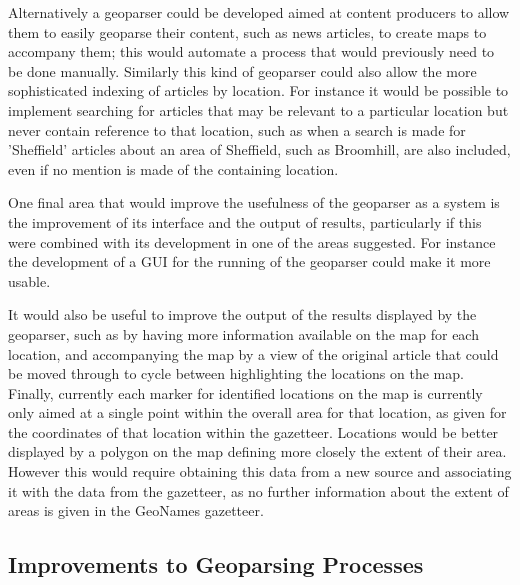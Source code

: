\documentclass[12pt, a4paper]{report}
\begin{document}
Alternatively a geoparser could be developed aimed at content producers to allow them to easily geoparse their content, such as news articles, to create maps to accompany them; this would automate a process that would previously need to be done manually. Similarly this kind of geoparser could also allow the more sophisticated indexing of articles by location. For instance it would be possible to implement searching for articles that may be relevant to a particular location but never contain reference to that location, such as when a search is made for 'Sheffield' articles about an area of Sheffield, such as Broomhill, are also included, even if no mention is made of the containing location.

One final area that would improve the usefulness of the geoparser as a system is the improvement of its interface and the output of results, particularly if this were combined with its development in one of the areas suggested. For instance the development of a GUI for the running of the geoparser could make it more usable.

It would also be useful to improve the output of the results displayed by the geoparser, such as by having more information available on the map for each location, and accompanying the map by a view of the original article that could be moved through to cycle between highlighting the locations on the map. Finally, currently each marker for identified locations on the map is currently only aimed at a single point within the overall area for that location, as given for the coordinates of that location within the gazetteer. Locations would be better displayed by a polygon on the map defining more closely the extent of their area. However this would require obtaining this data from a new source and associating it with the data from the gazetteer, as no further information about the extent of areas is given in the GeoNames gazetteer.






\subsection{Improvements to Geoparsing Processes}
\label{subsec:improvements_processes}
\end{document}
